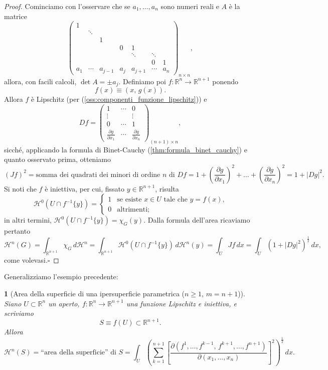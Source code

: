 \documentclass[a4paper,10pt,openright,oneside]{book}
\theoremstyle{theoremstyle}
\theoremstyle{theoremstylewoheader}
\newtheorem{teorema2}[teorema]{}
\theoremstyle{theoremstyle}
\theoremstyle{proofsecstyle}
\theoremstyle{nonumberplain}
\newtheorem{proof}{Dim.}
\newcommand{\RR}{\ensuremath{\mathbb{R}}}
\newcommand{\Haus}{\ensuremath{\mathcal{H}}}
\newcommand{\abs}[1]{\ensuremath{\lvert #1 \rvert}}
\renewcommand{\qedsymbol}{\ensuremath{\square}}
\newcommand{\qed}{\unskip\nobreak\hfill\nobreak\hspace{.5em}\qedsymbol}
\begin{document}
\begin{proof}
Cominciamo con l'osservare che se $a_1, \ldots, a_n$ sono numeri reali e $A$ è la matrice
\[
\left(\begin{array}{ccccccc}
1 & & & & & & \\
& \ddots & & & & & \\
& & 1 & & & & \\
& & & 0 & 1 & & \\
& & & & \ddots & \ddots & \\
& & & & & 0 & 1\\
a_1 & \cdots & a_{j-1} & a_j & a_{j+1} & \cdots & a_n
\end{array}\right)_{n \times n},
\]
allora, con facili calcoli, $\det A = \pm a_j$. Definiamo poi $f : \RR^n \rightarrow \RR^{n+1}$ ponendo
\[
f(x) \equiv (x,\, g(x)).
\]
Allora $f$ è Lipschitz (per (\ref{oss:componenti_funzione_lipschitz})) e
\[
Df = \left(\begin{array}{ccc}
1 & \cdots & 0\\
\vdots & & \vdots\\
0 & \cdots & 1\\
\displaystyle\frac{\partial g}{\partial x_1} & \cdots & \displaystyle\frac{\partial g}{\partial x_n}
\end{array}\right)_{(n+1) \times n},
\]
sicché, applicando la formula di Binet-Cauchy (\ref{thm:formula_binet_cauchy}) e quanto osservato prima, otteniamo
\[
(Jf)^2 = \text{somma dei quadrati dei minori di ordine $n$ di $Df$} = 1 + \left(\frac{\partial g}{\partial x_1}\right)^2 + \ldots + \left(\frac{\partial g}{\partial x_n}\right)^2 = 1 + \abs{Dg}^2.
\]
Si noti che $f$ è iniettiva, per cui, fissato $y \in \RR^{n+1}$, risulta 
\[
\Haus^0(U \cap f^{-1}\{y\}) = \begin{cases}
1 & \text{se esiste $x \in U$ tale che $y = f(x)$,}\\
0 & \text{altrimenti;}
\end{cases}
\]
in altri termini, $\Haus^0(U \cap f^{-1}\{y\}) = \chi_G(y)$. Dalla formula dell'area ricaviamo pertanto 
\[
\Haus^n(G) = \int_{\RR^{n+1}} \chi_G\, d\Haus^n = \int_{\RR^{n+1}} \Haus^0(U \cap f^{-1}\{y\})\, d\Haus^n(y) = \int_U Jf\, dx = \int_U (1 + \abs{Dg}^2)^{\frac{1}{2}}\, dx,
\]
come volevasi.\qed
\end{proof}

\noindent Generalizziamo l'esempio precedente:

\begin{teorema2}[Area della superficie di una ipersuperficie parametrica ($n \ge 1$, $m = n + 1$)]
\label{thm:area_superficie_ipersuperficie_parametrica}
Siano $U$\linebreak $\subset \RR^n$ un aperto, $f : \RR^n \rightarrow \RR^{n+1}$ una funzione Lipschitz e iniettiva, e scriviamo
\[
S \equiv f(U) \subset \RR^{n+1}.
\]
Allora
\[
\Haus^n(S) = \text{``area della superficie'' di $S$} = \int_U \left(\sum_{k=1}^{n+1} \left[\frac{\partial(f^1, \ldots, f^{k-1},\, f^{k+1}, \ldots, f^{n+1})}{\partial (x_1, \ldots, x_n)}\right]^2\right)^{\frac{1}{2}}\, dx.
\]
\end{teorema2}
\end{document}
